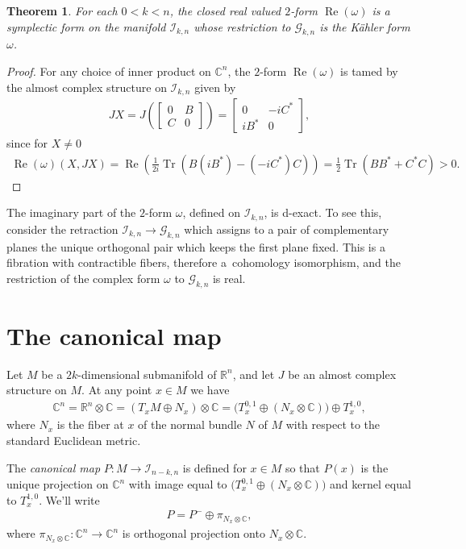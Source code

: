 \documentclass[11pt]{article}
\DeclareMathOperator{\Tr}{Tr}
\newtheorem{thm}{Theorem}[section]
\numberwithin{equation}{section}
\newcommand{\R}{\mathbb{R}}
\newcommand{\CC}{\mathbb{C}}
\newcommand{\cG}{{\mathcal G}}
\newcommand{\cI}{{\mathcal I}}
\begin{document}
\begin{thm}For each $0 < k < n$, the closed real valued $2$-form $\operatorname{Re}(\omega)$ is a symplectic form on the manifold $\cI_{k,n}$ whose restriction to $\cG_{k,n}$ is the K\"ahler form $\omega$.
\end{thm}

\begin{proof} For any choice of inner product on $\CC^n$, the $2$-form $\operatorname{Re}(\omega)$ is tamed by the almost complex structure on $\cI_{k,n}$ given by
\begin{gather*}
JX = J\left(
\begin{bmatrix}
0 & B \\
C & 0
\end{bmatrix}
\right)
=
\begin{bmatrix}
0 & -iC^* \\
iB^* & 0
\end{bmatrix},
\end{gather*}
since for $X\neq 0$
\begin{gather*}
\operatorname{Re}(\omega)(X,JX) = \operatorname{Re} \left ( \frac {1}{2i} \Tr ( B(iB^*) - (-iC^*)C) \right) = \frac 1 2 \Tr(BB^* + C^*C) > 0.\tag*{\qed}
\end{gather*} \renewcommand{\qed}{}
\end{proof}

The imaginary part of the $2$-form $\omega$, defined on $\cI_{k,n}$, is d-exact. To see this, consider the retraction $\cI_{k,n} \to \cG_{k,n}$ which assigns to a pair of complementary planes the unique orthogonal pair which keeps the first plane fixed. This is a fibration with contractible fibers, therefore a~cohomology isomorphism, and the restriction of the complex form $\omega$ to $\cG_{k,n}$ is real.

\section{The canonical map} \label{sec;Pmap}

\begin{defn}
Let $M$ be a $2k$-dimensional submanifold of $\R^n$, and let $J$ be an almost complex structure on $M$. At any point $x \in M$ we have
\begin{gather*}
\CC^n = \R^n \otimes \CC = ( T_x M \oplus N_x ) \otimes \CC = \big( T^{0,1}_x \oplus ( N_x \otimes \CC ) \big) \oplus T^{1,0}_x,
\end{gather*}
where $N_x$ is the fiber at $x$ of the normal bundle $N$ of $M$ with respect to the standard Euclidean metric.

The \emph{canonical map} $P\colon M \to \cI_{n-k,n}$ is defined for $x \in M$ so that $P(x)$ is the unique projection on $\CC^n$ with image equal to $\big( T^{0,1}_x \oplus ( N_x \otimes \CC) \big)$ and kernel equal to $T^{1,0}_x$. We'll write
\begin{gather*}
P = P^- \oplus \pi_{N_x \otimes \CC},
\end{gather*}
where $\pi_{N_x \otimes \CC}\colon \CC^n \to \CC^n$ is orthogonal projection onto $N_x \otimes \CC$.
\end{defn}
\end{document}
